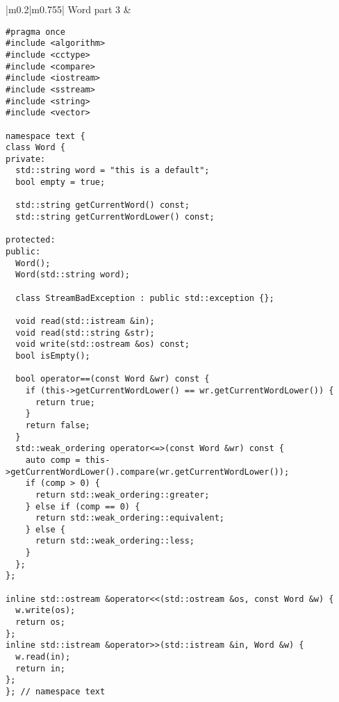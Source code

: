 \documentclass[main.tex,fontsize=8pt,paper=a4,paper=portrait,DIV=calc,]{scrartcl}
\begin{document}
\begin{table}[ht!]
\begin{tabular}{|m{0.2\linewidth}|m{0.755\linewidth}|}
\hline
Word part 3 & 
\vspace{2mm}
\begin{lstlisting}
#pragma once
#include <algorithm>
#include <cctype>
#include <compare>
#include <iostream>
#include <sstream>
#include <string>
#include <vector>

namespace text {
class Word {
private:
  std::string word = "this is a default";
  bool empty = true;

  std::string getCurrentWord() const;
  std::string getCurrentWordLower() const;

protected:
public:
  Word();
  Word(std::string word);

  class StreamBadException : public std::exception {};

  void read(std::istream &in);
  void read(std::string &str);
  void write(std::ostream &os) const;
  bool isEmpty();

  bool operator==(const Word &wr) const {
    if (this->getCurrentWordLower() == wr.getCurrentWordLower()) {
      return true;
    }
    return false;
  }
  std::weak_ordering operator<=>(const Word &wr) const {
    auto comp = this->getCurrentWordLower().compare(wr.getCurrentWordLower());
    if (comp > 0) {
      return std::weak_ordering::greater;
    } else if (comp == 0) {
      return std::weak_ordering::equivalent;
    } else {
      return std::weak_ordering::less;
    }
  };
};

inline std::ostream &operator<<(std::ostream &os, const Word &w) {
  w.write(os);
  return os;
};
inline std::istream &operator>>(std::istream &in, Word &w) {
  w.read(in);
  return in;
};
}; // namespace text
\end{lstlisting}
\\
\hline
\end{tabular}
\end{table}
\pagebreak
\end{document}
